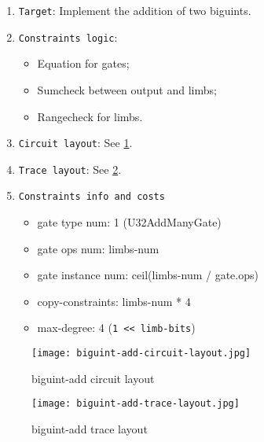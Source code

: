 
\begin{enumerate}
    \item \verb|Target|: Implement the addition of two biguints.
    \item \verb|Constraints logic|: 
        \begin{itemize}
            \item Equation for gates;
            \item Sumcheck between output and limbs;
            \item Rangecheck for limbs.
        \end{itemize}
    \item \verb|Circuit layout|: See \ref{fig:biguint-add-circuit-layout}.
    \item \verb|Trace layout|: See \ref{fig:biguint-add-trace-layout}.
    \item \verb|Constraints info and costs|
    \begin{itemize}
        \item gate type num: 1 (U32AddManyGate)
        \item gate ops num: limbs-num
        \item gate instance num: ceil(limbs-num / gate.ops)
        \item copy-constraints: limbs-num * 4
        \item max-degree: 4 (\verb|1 << limb-bits|)
    \end{itemize}
\end{enumerate}

\begin{figure}[!ht]
    \centering
    \texttt{[image: biguint-add-circuit-layout.jpg]}
    \caption{biguint-add circuit layout}
    \label{fig:biguint-add-circuit-layout}
\end{figure}
 
\begin{figure}[!ht]
    \centering
    \texttt{[image: biguint-add-trace-layout.jpg]}
    \caption{biguint-add trace layout}
    \label{fig:biguint-add-trace-layout}
\end{figure}